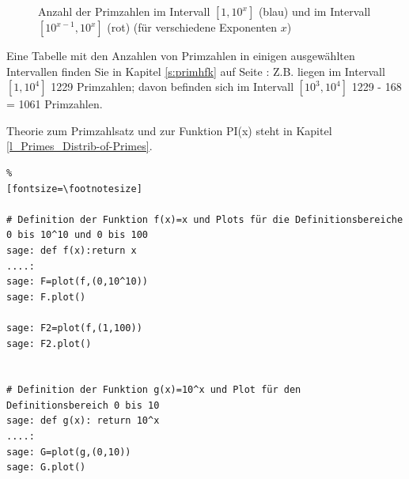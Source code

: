 \begin{refsegment}
\begin{figure}[!htb]
	\centering
	\hfill
	\caption{Anzahl der Primzahlen im Intervall $[1, 10^x]$ (blau) und im
         Intervall $[10^{x-1},10^x]$ (rot) (für verschiedene Exponenten $x$)}
	\label{deltazehnxdurchlnxbis}
\end{figure}


Eine Tabelle mit den Anzahlen von Primzahlen in einigen ausgewählten Intervallen
finden Sie in Kapitel \ref{s:primhfk} auf Seite \pageref{s:primhfk}:
Z.B. liegen im Intervall $[1, 10^4]$ 1229 Primzahlen; davon befinden sich im
Intervall $[10^3, 10^4]$ 1229 - 168 = 1061 Primzahlen.

Theorie zum Primzahlsatz und zur Funktion PI(x) steht in Kapitel
\ref{l_Primes_Distrib-of-Primes}.



\begin{sagecode}
\begin{Verbatim}%
[fontsize=\footnotesize]

# Definition der Funktion f(x)=x und Plots für die Definitionsbereiche 0 bis 10^10 und 0 bis 100
sage: def f(x):return x
....:
sage: F=plot(f,(0,10^10))
sage: F.plot()

sage: F2=plot(f,(1,100))
sage: F2.plot()


# Definition der Funktion g(x)=10^x und Plot für den Definitionsbereich 0 bis 10
sage: def g(x): return 10^x
....:
sage: G=plot(g,(0,10))
sage: G.plot()



\end{Verbatim}
\end{sagecode}
\end{refsegment}
